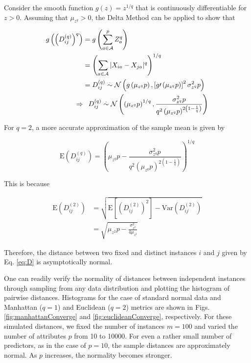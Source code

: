 \documentclass[10pt,letterpaper]{article}\usepackage[]{graphicx}\usepackage[]{color}
\begin{document}
Consider the smooth function $g(z) = z^{1/q}$ that is continuously differentiable for $z>0$. Assuming that $\mu_{z^q}>0$, the Delta Method \cite{allStats} can be applied to show that 

\begin{equation}\label{eq:DqDeltaMethod}
\begin{aligned}
g\left(\left(D^{(q)}_{ij}\right)^q\right) &= g\left(\displaystyle \sum_{a \in \mathcal{A}}^{p}Z^q_a\right) \\
&= \left(\sum_{a \in \mathcal{A}} |X_{ia} - X_{ja}|^q\right)^{1/q} \\
&= D^{(q)}_{ij} \overset{.}{\sim} \mathcal{N}\left(g\left(\mu_{z^q}p\right),\left[g\prime \left(\mu_{z^q}p\right)\right]^2\sigma^2_{z^q}p\right) \\
\Rightarrow &\hphantom{=} D^{(q)}_{ij} \overset{.}{\sim} \mathcal{N}\left(\left(\mu_{z^q}p\right)^{1/q},\frac{\sigma^2_{z^q}p}{q^2\left(\mu_{z^q}p\right)^{2\left(1 - \frac{1}{q}\right)}}\right)
\end{aligned}
\end{equation}

For $q = 2$, a more accurate approximation of the sample mean is given by

\begin{equation}\label{eq:DqMeanImproved}
\text{E}\left(D^{(q)}_{ij}\right) = \left(\mu_{z^q}p - \frac{\sigma^2_{z^q}p}{q^2\left(\mu_{z^q}p\right)^{2\left(1 - \frac{1}{q}\right)}}\right)^{1/q}
\end{equation}

This is because

\begin{equation}\label{eq:DqImprovedExplaned}
\begin{aligned}
\text{E}\left(D^{(2)}_{ij}\right) &= \sqrt{\text{E}\left[\left(D^{(2)}_{ij}\right)^2\right] - \text{Var}\left(D^{(2)}_{ij}\right)} \\
&= \sqrt{\mu_{z^2}p - \frac{\sigma^2_{z^2}}{4\mu_{z^2}}}
\end{aligned}
\end{equation}

Therefore, the distance between two fixed and distinct instances $i$ and $j$ given by Eq. \ref{eq:D} is asymptotically normal.

One can readily verify the normality of distances between independent instances through sampling from any data distribution and plotting the histogram of pairwise distances. Histograms for the case of standard normal data and Manhattan ($q=1$) and Euclidean ($q=2$) metrics are shown in Figs. \ref{fig:manhattanConverge} and \ref{fig:euclideanConverge}, respectively. For these simulated distances, we fixed the number of instances $m=100$ and varied the number of attributes $p$ from 10 to 10000. For even a rather small number of predictors, as in the case of $p=10$, the sample distances are approximately normal. As $p$ increases, the normality becomes stronger.
\end{document}
